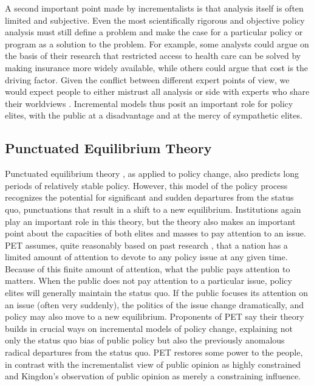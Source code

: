 A second important point made by incrementalists is that analysis itself is often limited and subjective. Even the most scientifically rigorous and objective policy analysis must still define a problem and make the case for a particular policy or program as a solution to the problem. For example, some analysts could argue on the basis of their research that restricted access to health care can be solved by making insurance more widely available, while others could argue that cost is the driving factor. Given the conflict between different expert points of view, we would expect people to either mistrust all analysis \citep{Lindblom1965} or side with experts who share their worldviews \citep{Zaller1992a}. Incremental models thus posit an important role for policy elites, with the public at a disadvantage and at the mercy of sympathetic elites.

\subsection*{Punctuated Equilibrium Theory}
Punctuated equilibrium theory \citep[PET; see][]{Jones2005,True1999}, as applied to policy change, also predicts long periods of relatively stable policy. However, this model of the policy process recognizes the potential for significant and sudden departures from the status quo, punctuations that result in a shift to a new equilibrium. Institutions again play an important role in this theory, but the theory also makes an important point about the capacities of both elites and masses to pay attention to an issue. PET assumes, quite reasonably based on past research \citep{Downs1972}, that a nation has a limited amount of attention to devote to any policy issue at any given time. Because of this finite amount of attention, what the public pays attention to matters. When the public does not pay attention to a particular issue, policy elites will generally maintain the status quo. If the public focuses its attention on an issue (often very suddenly), the politics of the issue change dramatically, and policy may also move to a new equilibrium. Proponents of PET say their theory builds in crucial ways on incremental models of policy change, explaining not only the status quo bias of public policy but also the previously anomalous radical departures from the status quo. PET restores some power to the people, in contrast with the incrementalist view of public opinion as highly constrained and Kingdon's observation of public opinion as merely a constraining influence.

